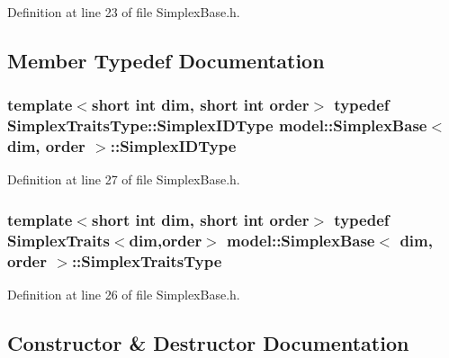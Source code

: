 Definition at line 23 of file Simplex\+Base.\+h.



\subsection{Member Typedef Documentation}
\hypertarget{structmodel_1_1_simplex_base_a0caaeafb7f385ed49b6463a9e54a127c}{}
\subsubsection[{Simplex\+I\+D\+Type}]{\setlength{\rightskip}{0pt plus 5cm}template$<$short int dim, short int order$>$ typedef {\bf Simplex\+Traits\+Type\+::\+Simplex\+I\+D\+Type} {\bf model\+::\+Simplex\+Base}$<$ {\bf dim}, order $>$\+::{\bf Simplex\+I\+D\+Type}}\label{structmodel_1_1_simplex_base_a0caaeafb7f385ed49b6463a9e54a127c}


Definition at line 27 of file Simplex\+Base.\+h.

\hypertarget{structmodel_1_1_simplex_base_aa840eb117c09ab144b9ea09c11be5ed7}{}
\subsubsection[{Simplex\+Traits\+Type}]{\setlength{\rightskip}{0pt plus 5cm}template$<$short int dim, short int order$>$ typedef {\bf Simplex\+Traits}$<${\bf dim},order$>$ {\bf model\+::\+Simplex\+Base}$<$ {\bf dim}, order $>$\+::{\bf Simplex\+Traits\+Type}}\label{structmodel_1_1_simplex_base_aa840eb117c09ab144b9ea09c11be5ed7}


Definition at line 26 of file Simplex\+Base.\+h.



\subsection{Constructor \& Destructor Documentation}
\hypertarget{structmodel_1_1_simplex_base_aa61005cc2601ee5721fbd89cffa3e28f}{}
